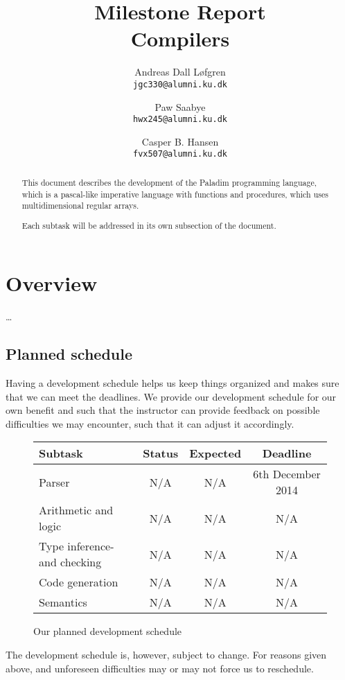 \documentclass[11pt,a4paper]{article}
\title%
{%
	{\large Milestone Report}\\
	Compilers
}
\author%
{%
	Andreas Dall Løfgren\\
	{\tt jgc330@alumni.ku.dk}
	\and
	Paw Saabye\\
	{\tt hwx245@alumni.ku.dk}
	\and
	Casper B. Hansen\\
	{\tt fvx507@alumni.ku.dk}
}
\begin{document}
\clearpage
\maketitle
\thispagestyle{empty}
\begin{multicols}{2}
\begin{abstract}
This document describes the development of the Paladim programming language,
which is a pascal-like imperative language with functions and procedures, which
uses multidimensional regular arrays.

Each subtask will be addressed in its own subsection of the document.
\end{abstract}
\vfill
\columnbreak%
\tableofcontents
\end{multicols}

\clearpage
\section{Overview}
\ldots

\subsection{Planned schedule}
Having a development schedule helps us keep things organized and makes sure
that we can meet the deadlines. We provide our development schedule for our
own benefit and such that the instructor can provide feedback on possible
difficulties we may encounter, such that it can adjust it accordingly.
\begin{figure}[H]
	\centering
	\begin{tabular}{|l|c|c|c|}
		\hline
		{\bf Subtask} & {\bf Status} & {\bf Expected} & {\bf Deadline} \\ \hline
		Parser & N/A & N/A & 6th December 2014 \\ \hline
		Arithmetic and logic & N/A & N/A & N/A \\ \hline
		Type inference- and checking & N/A & N/A & N/A \\ \hline
		Code generation & N/A & N/A & N/A \\ \hline
		Semantics & N/A & N/A & N/A \\ \hline
	\end{tabular}
	\label{table:schedule}
	\caption{Our planned development schedule}
\end{figure}
The development schedule is, however, subject to change. For reasons given
above, and unforeseen difficulties may or may not force us to reschedule.
\end{document}
